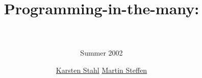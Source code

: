 \documentclass[ps,landscape,accumulate,economy,slideColor,nototal]{prosper}
\title{Programming-in-the-many: 
  \\ \Slime\\ }
\subtitle{ \small Summer 2002}
\author{%
  \href{http://www.informatik.uni-kiel.de/~kst}{Karsten Stahl}
  \quad
  \href{http://www.informatik.uni-kiel.de/~ms}{Martin Steffen}
  }
\begin{document}
\maketitle{}







%
%




\end{document}
